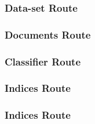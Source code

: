 \subsubsection{Data-set Route}
\subsubsection{Documents Route}
\subsubsection{Classifier Route}
\subsubsection{Indices Route}
\subsubsection{Indices Route}